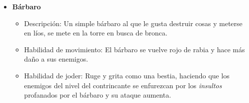 \begin{itemize}
\begin{itemize}
    \end{itemize}
    \item \textbf{Bárbaro}  %
    \begin{itemize}
        \item Descripción: Un simple bárbaro al que le gusta destruir cosas y meterse en líos, se mete en la torre en busca de bronca.
        \item Habilidad de movimiento: El bárbaro se vuelve rojo de rabia y hace más daño a sus enemigos.
        \item Habilidad de joder: Ruge y grita como una bestia, haciendo que los enemigos del nivel del contrincante se enfurezcan por los \textit{insultos} profanados por el bárbaro y su ataque aumenta.
    \end{itemize}
\end{itemize}